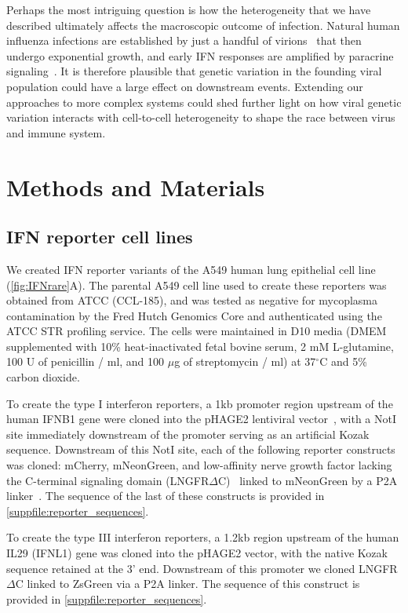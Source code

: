 \documentclass[10pt,letterpaper]{article}
\newcommand{\FIG}[1]{\autoref{fig:#1}}
\newcommand{\SUPPFILE}[1]{\autoref{suppfile:#1}}
\begin{document}
Perhaps the most intriguing question is how the heterogeneity that we have described ultimately affects the macroscopic outcome of infection.
Natural human influenza infections are established by just a handful of virions~\cite{mccrone2018stochastic, xue2018reconciling, varble2014influenza} that then undergo exponential growth, and early IFN responses are amplified by paracrine signaling~\cite{stetson2006type,honda2006type}.
It is therefore plausible that genetic variation in the founding viral population could have a large effect on downstream events.
Extending our approaches to more complex systems could shed further light on how viral genetic variation interacts with cell-to-cell heterogeneity to shape the race between virus and immune system.


\section*{Methods and Materials}

\subsection*{IFN reporter cell lines}
We created IFN reporter variants of the A549 human lung epithelial cell line (\FIG{IFNrare}A).
The parental A549 cell line used to create these reporters was obtained from ATCC (CCL-185), and was tested as negative for mycoplasma contamination by the Fred Hutch Genomics Core and authenticated using the ATCC STR profiling service.
The cells were maintained in D10 media (DMEM supplemented with 10\% heat-inactivated fetal bovine serum, 2 mM L-glutamine, 100 U of penicillin / ml, and 100 $\mu$g of streptomycin / ml) at 37$^{\circ}$C and 5\% carbon dioxide.

To create the type I interferon reporters, a 1kb promoter region upstream of the human IFNB1 gene were cloned into the pHAGE2 lentiviral vector~\cite{oconnell2010lentiviral}, with a NotI site immediately downstream of the promoter serving as an artificial Kozak sequence. 
Downstream of this NotI site, each of the following reporter constructs was cloned: mCherry, mNeonGreen, and low-affinity nerve growth factor lacking the C-terminal signaling domain (LNGFR$\Delta$C)~\cite{bonini1997hsv,ruggieri1997cell} linked to mNeonGreen by a P2A linker~\cite{kim2011high}.
The sequence of the last of these constructs is provided in \SUPPFILE{reporter_sequences}.

To create the type III interferon reporters, a 1.2kb region upstream of the human IL29 (IFNL1) gene was cloned into the pHAGE2 vector, with the native Kozak sequence retained at the 3' end. 
Downstream of this promoter we cloned LNGFR$\Delta$C linked to ZsGreen via a P2A linker.
The sequence of this construct is provided in \SUPPFILE{reporter_sequences}.
 
\end{document}
